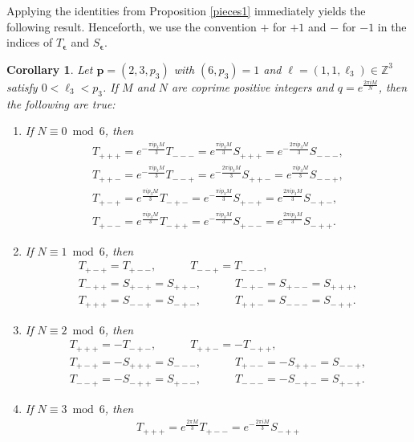 \documentclass[11pt,reqno]{amsart}
\newtheorem{corollary}[theorem]{Corollary}
\theoremstyle{definition}
\numberwithin{equation}{section}
\renewcommand{\=}{\;=\;}
\def\qqquad{\qquad\quad}
\begin{document}
Applying the identities from Proposition \ref{pieces1} immediately yields the following result. Henceforth, we use the convention $+$ for $+1$ and $-$ for $-1$ in the indices of $T_{\bm \epsilon}$ and $S_{\bm \epsilon}$. 

\begin{corollary}\label{pieces}
Let $\bm{p} = (2,3, p_3)$ with $(6,p_3)=1$ and $\bm{\ell} = (1, 1, \ell_3) \in \mathbb{Z}^3$ satisfy $0 < \ell_3 < p_3$. If $M$ and $N$ are coprime positive integers and $q=e^{\frac{2\pi i M}{N}}$, then the following are true:
 \begin{enumerate}
   \item If $N\equiv 0 \bmod 6$, then
  \begin{gather*}\label{N0}
  T_{+++}
    =e^{-\frac{\pi ip_3 M}{3}} T_{---}
    =e^{\frac{\pi ip_3 M}{3}} S_{+++}
    =e^{-\frac{2\pi ip_3 M}{3}}S_{---},\\
  T_{++-}
    =e^{-\frac{\pi ip_3 M}{3}} T_{--+}
    =e^{-\frac{2\pi ip_3 M}{3}} S_{++-}
    =e^{\frac{\pi ip_3 M}{3}} S_{--+},\\
  T_{+-+}
    =e^{\frac{\pi ip_3 M}{3}} T_{-+-}
    =e^{-\frac{\pi ip_3 M}{3}} S_{+-+}
    =e^{\frac{2\pi ip_3 M}{3}} S_{-+-},\\
  T_{+--}
    =e^{\frac{\pi ip_3 M}{3}} T_{-++}
    =e^{-\frac{\pi ip_3 M}{3}} S_{+--}
    =e^{\frac{2\pi ip_3 M}{3}} S_{-++}.
  \end{gather*}
  \item If $N\equiv 1 \bmod 6$, then 
  \begin{gather*}
   T_{+-+} = T_{+--},\qqquad
   T_{--+} = T_{---}
   ,\\
   T_{-++} = S_{+-+} = S_{++-},\qqquad
   T_{-+-} = S_{+--} = S_{+++}
   ,\\
   T_{+++} = S_{--+} = S_{-+-},\qqquad
   T_{++-} = S_{---} = S_{-++}.
\end{gather*}
  \item If $N\equiv 2 \bmod 6$, then
   \begin{gather*}
   T_{+++} = -T_{-+-},\qqquad
   T_{++-} = -T_{-++},\\
   T_{+-+} = -S_{+++}=S_{---},\qqquad
   T_{+--} = -S_{++-}=S_{--+},\\
   T_{--+} = -S_{-++}=S_{+--},\qqquad
   T_{---} = -S_{-+-}=S_{+-+}.
  \end{gather*}
  \item If $N\equiv 3 \bmod 6$, then
  \begin{gather*}
  T_{+++}
    =e^{\frac{2\pi M}{3}} T_{+--}
    =e^{-\frac{2\pi i M}{3}}S_{-++}

\end{gather*}
\end{enumerate}
\end{corollary}
\end{document}
